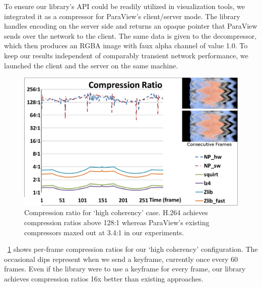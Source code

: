 \documentclass[review]{vgtc}                 %
\begin{document}

To ensure our library's API could be readily utilized in visualization
tools, we integrated it as a compressor for ParaView's client/server
mode.  The library handles encoding on the server side and returns an
opaque pointer that ParaView sends over the network to the client.  The
same data is given to the decompressor, which then produces an RGBA
image with faux alpha channel of value 1.0.  To keep our results independent of
comparably transient network performance, we launched the client and the server 
on the same machine.


\begin{figure}[htb]
  \centering
  \includegraphics[width=\columnwidth]{compressRatio.eps}
  \caption{Compression ratio for `high coherency' case.
	H.264 achieves compression ratios above 128:1 whereas ParaView's existing
	compressors maxed out at 3.4:1 in our experiments.}
  \label{fig:compressRatio}
\end{figure}

~\cref{fig:compressRatio} shows per-frame compression ratios for
our `high coherency' configuration.  The occasional dips represent
when we send a keyframe, currently once every 60 frames.  Even if the
library were to use a keyframe for every frame, our library achieves
compression ratios 16x better than existing approaches.
\end{document}
